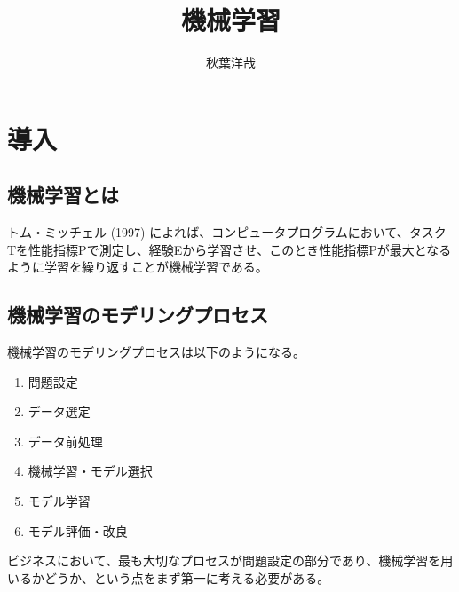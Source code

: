 \documentclass{ltjsarticle}
\begin{document}
\title{機械学習}
\author{秋葉洋哉}
\maketitle
\section{導入}
\subsection{機械学習とは}
トム・ミッチェル (1997) によれば、コンピュータプログラムにおいて、タスクTを性能指標Pで測定し、経験Eから学習させ、このとき性能指標Pが最大となるように学習を繰り返すことが機械学習である。

\subsection{機械学習のモデリングプロセス}
機械学習のモデリングプロセスは以下のようになる。
\begin{enumerate}
  \item 問題設定
  \item データ選定
  \item データ前処理
  \item 機械学習・モデル選択
  \item モデル学習
  \item モデル評価・改良
\end{enumerate}
ビジネスにおいて、最も大切なプロセスが問題設定の部分であり、機械学習を用いるかどうか、という点をまず第一に考える必要がある。
\end{document}
